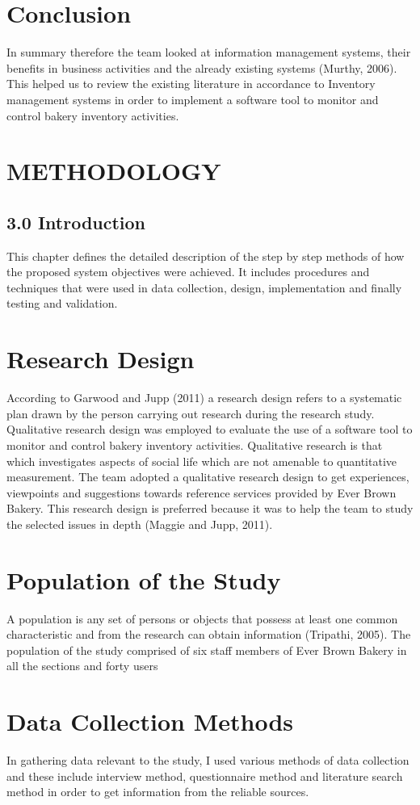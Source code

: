 \documentclass[options]{article}
\begin{document}
\section{\textbf{Conclusion}}
In summary therefore the team looked at information management systems, their benefits in business activities and the already existing systems (Murthy, 2006). This helped us to review the existing literature in accordance to Inventory management systems in order to implement a software tool to monitor and control bakery inventory activities.  
\section{\textbf{METHODOLOGY}}
\subsection{\textbf{3.0 Introduction}}
This chapter defines the detailed description of the step by step methods of how the proposed system objectives were achieved. It includes procedures and techniques that were used in data collection, design, implementation and finally testing and validation.
\section{\textbf{ Research Design}}
According to Garwood and Jupp (2011) a research design refers to a systematic plan drawn by the person carrying out research during the research study. Qualitative research design was employed to evaluate the use of a software tool to monitor and control bakery inventory activities. Qualitative research is that which investigates aspects of social life which are not amenable to quantitative measurement. The team adopted a qualitative research design to get experiences, viewpoints and suggestions towards reference services provided by Ever Brown Bakery. This research design is preferred because it was to help the team to study the selected issues in depth (Maggie and Jupp, 2011).
\section{\textbf{Population of the Study}}
A population is any set of persons or objects that possess at least one common characteristic and from the research can obtain information (Tripathi, 2005). The population of the study comprised of six staff members of Ever Brown Bakery in all the sections and forty users
\section{\textbf{Data Collection Methods}}
In gathering data relevant to the study, I used various methods of data collection and these include interview method, questionnaire method and literature search method in order to get information from the reliable sources.
\end{document}
